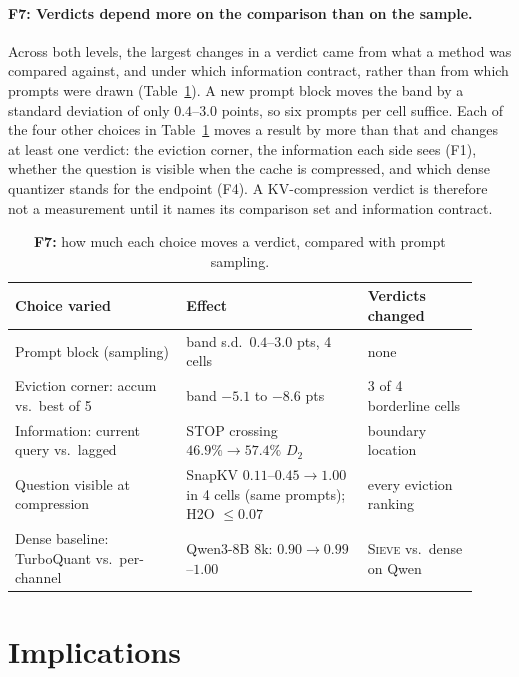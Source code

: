 \documentclass{article}
\newcommand{\sieve}{\textsc{Sieve}}
\theoremstyle{definition}
\begin{document}
\paragraph{F7: Verdicts depend more on the comparison than on the sample.}
Across both levels, the largest changes in a verdict came from what a method was compared against, and under which information contract, rather than from which prompts were drawn (Table~\ref{tab:contract}).  A new prompt block moves the band by a standard deviation of only $0.4$--$3.0$ points, so six prompts per cell suffice.  Each of the four other choices in Table~\ref{tab:contract} moves a result by more than that and changes at least one verdict: the eviction corner, the information each side sees (F1), whether the question is visible when the cache is compressed, and which dense quantizer stands for the endpoint (F4).  A KV-compression verdict is therefore not a measurement until it names its comparison set and information contract.

\begin{table}[t]
\centering
\small
\setlength{\tabcolsep}{4pt}
\caption{\textbf{F7:} how much each choice moves a verdict, compared with prompt sampling.}
\label{tab:contract}
\begin{tabular}{@{}p{0.34\linewidth}p{0.36\linewidth}p{0.22\linewidth}@{}}
\toprule
\textbf{Choice varied} & \textbf{Effect} & \textbf{Verdicts changed} \\
\midrule
Prompt block (sampling) & band s.d.\ $0.4$--$3.0$ pts, 4 cells & none \\
Eviction corner: accum vs.\ best of 5 & band $-5.1$ to $-8.6$ pts & 3 of 4 borderline cells \\
Information: current query vs.\ lagged & STOP crossing $46.9\%\to57.4\%$ $D_2$ & boundary location \\
Question visible at compression & SnapKV $0.11$--$0.45\to1.00$ in 4 cells (same prompts); H2O $\le0.07$ & every eviction ranking \\
Dense baseline: TurboQuant vs.\ per-channel & Qwen3-8B 8k: $0.90\to0.99$--$1.00$ & \sieve{} vs.\ dense on Qwen \\
\bottomrule
\end{tabular}
\vspace{-2mm}
\end{table}


\section{Implications}
\label{sec:implications}
\end{document}
